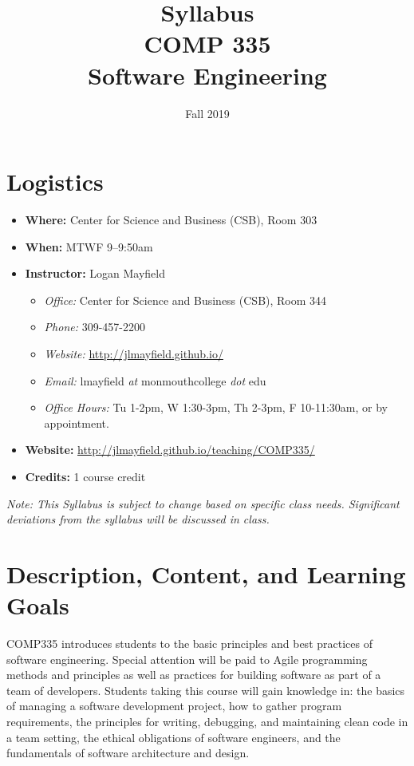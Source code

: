 \documentclass[10pt]{article}
\title{Syllabus \\ COMP 335 \\ Software Engineering}
\author{  }
\date{Fall 2019}
\begin{document}
\maketitle

\section{Logistics}
\begin{itemize}
\item \textbf{Where: }Center for Science and Business (CSB), Room 303
\item \textbf{When: } MTWF 9--9:50am
\item \textbf{Instructor: } Logan Mayfield
\begin{itemize}
\item \textit{Office: } Center for Science and Business (CSB), Room 344
\item \textit{Phone: } 309-457-2200 %
\item \textit{Website: } \url{http://jlmayfield.github.io/}
\item \textit{Email: } lmayfield \textit{at} monmouthcollege \textit{dot} edu
\item \textit{Office Hours: }  Tu 1-2pm, W 1:30-3pm, Th 2-3pm, F 10-11:30am, or by appointment.
\end{itemize}
\item \textbf{Website: } \url{http://jlmayfield.github.io/teaching/COMP335/}
\item \textbf{Credits: } 1 course credit
\end{itemize}
\emph{Note: This Syllabus is subject to change based on specific class needs. Significant deviations from the syllabus will be discussed in class.}

\section{Description, Content, and Learning Goals}

COMP335 introduces students to the basic principles and best practices of software engineering. Special attention will be paid to Agile programming methods and principles as well as practices for building software as part of a team of developers.  Students taking this course will gain knowledge in: the basics of managing a software development project, how to gather program requirements, the principles for writing, debugging, and maintaining clean code in a team setting, the ethical obligations of software engineers, and the fundamentals of software architecture and design.
\end{document}
